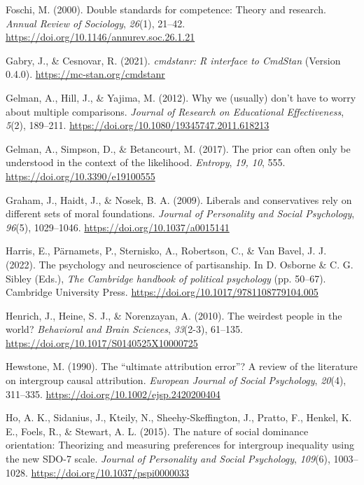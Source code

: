 \documentclass[12pt, letterpaper]{article}
\newenvironment{CSLReferences}[2]{}{}
\begin{document}
\begin{CSLReferences}{1}{0}
\leavevmode{}%
Foschi, M. (2000). Double standards for competence: Theory and research.
\emph{Annual Review of Sociology}, \emph{26}(1), 21--42.
\url{https://doi.org/10.1146/annurev.soc.26.1.21}

\leavevmode{}%
Gabry, J., \& Cesnovar, R. (2021). \emph{{cmdstanr}: {R} interface to
{CmdStan}} (Version 0.4.0). \url{https://mc-stan.org/cmdstanr}

\leavevmode{}%
Gelman, A., Hill, J., \& Yajima, M. (2012). Why we (usually) don't have
to worry about multiple comparisons. \emph{Journal of Research on
Educational Effectiveness}, \emph{5}(2), 189--211.
\url{https://doi.org/10.1080/19345747.2011.618213}

\leavevmode{}%
Gelman, A., Simpson, D., \& Betancourt, M. (2017). The prior can often
only be understood in the context of the likelihood. \emph{Entropy},
\emph{19, 10}, 555. \url{https://doi.org/10.3390/e19100555}

\leavevmode{}%
Graham, J., Haidt, J., \& Nosek, B. A. (2009). Liberals and
conservatives rely on different sets of moral foundations. \emph{Journal
of Personality and Social Psychology}, \emph{96}(5), 1029--1046.
\url{https://doi.org/10.1037/a0015141}

\leavevmode{}%
Harris, E., Pärnamets, P., Sternisko, A., Robertson, C., \& Van Bavel,
J. J. (2022). The psychology and neuroscience of partisanship. In D.
Osborne \& C. G. Sibley (Eds.), \emph{The {Cambridge} handbook of
political psychology} (pp. 50--67). Cambridge University Press.
\url{https://doi.org/10.1017/9781108779104.005}

\leavevmode{}%
Henrich, J., Heine, S. J., \& Norenzayan, A. (2010). The weirdest people
in the world? \emph{Behavioral and Brain Sciences}, \emph{33}(2-3),
61--135. \url{https://doi.org/10.1017/S0140525X10000725}

\leavevmode{}%
Hewstone, M. (1990). The {``ultimate attribution error''}? {A} review of
the literature on intergroup causal attribution. \emph{European Journal
of Social Psychology}, \emph{20}(4), 311--335.
\url{https://doi.org/10.1002/ejsp.2420200404}

\leavevmode{}%
Ho, A. K., Sidanius, J., Kteily, N., Sheehy-Skeffington, J., Pratto, F.,
Henkel, K. E., Foels, R., \& Stewart, A. L. (2015). The nature of social
dominance orientation: {Theorizing} and measuring preferences for
intergroup inequality using the new {SDO}-7 scale. \emph{Journal of
Personality and Social Psychology}, \emph{109}(6), 1003--1028.
\url{https://doi.org/10.1037/pspi0000033}


\end{CSLReferences}
\end{document}
